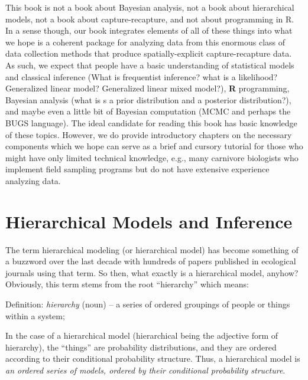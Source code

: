 This book is not a book about Bayesian analysis, not a book about
hierarchical models, not a book about capture-recapture, and not about
programming in R. In a sense though, our book integrates elements of
all of these things into what we hope is a coherent package for
analyzing data from this enormous class of data collection methods
that produce spatially-explicit capture-recapture data.   As such, we
expect that people have a basic understanding of statistical models
and classical inference (What is frequentist inference? what is a
likelihood? Generalized linear model? Generalized linear mixed
model?),
{\bf R} programming,
 Bayesian analysis (what is s a prior distribution and a
posterior distribution?),
and maybe even a little bit
of Bayesian
computation (MCMC and perhaps the BUGS language).
The ideal candidate for reading this book has basic knowledge of these
topics. However, we do provide introductory chapters on the necessary
components which we hope can serve as a brief and cursory tutorial for
those who might have only limited technical knowledge, e.g., many
carnivore biologists who implement field sampling programs but do not
have extensive experience analyzing data.





\section{Hierarchical Models and Inference}

The term hierarchical modeling (or hierarchical model) has become
something of a buzzword over the last decade with hundreds of papers
published in ecological journals using that term.  So then, what
exactly is a hierarchical model, anyhow? Obviously, this term stems
from the root ``hierarchy'' which means:

\vspace{.1in}

{\flushleft
Definition: {\it hierarchy} (noun) -- a series of ordered groupings of people or things within a system;
}

\vspace{.1in}

In the case of a hierarchical model (hierarchical being the adjective
form of hierarchy), the ``things'' are probability distributions, and
they are ordered according to their conditional probability structure.
Thus, a hierarchical model is {\it an ordered series of models,
  ordered by their conditional probability structure}.

